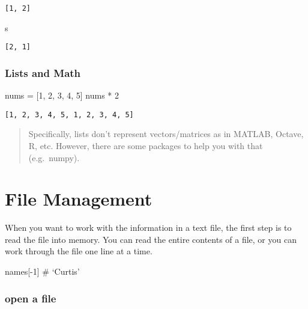 \documentclass[
  letterpaper,
  DIV=11,
  numbers=noendperiod]{scrreprt}
\newenvironment{Shaded}{\begin{snugshade}}{\end{snugshade}}
\newcommand{\DecValTok}[1]{\textcolor[rgb]{0.68,0.00,0.00}{#1}}
\newcommand{\NormalTok}[1]{\textcolor[rgb]{0.00,0.46,0.62}{#1}}
\newcommand{\OperatorTok}[1]{\textcolor[rgb]{0.37,0.37,0.37}{#1}}
\begin{document}
\begin{verbatim}
[1, 2]
\end{verbatim}

\begin{Shaded}
\begin{Highlighting}[]
\NormalTok{s}
\end{Highlighting}
\end{Shaded}

\begin{verbatim}
[2, 1]
\end{verbatim}

\hypertarget{lists-and-math}{%
\subsubsection{Lists and Math}\label{lists-and-math}}

\begin{Shaded}
\begin{Highlighting}[]
\NormalTok{nums }\OperatorTok{=}\NormalTok{ [}\DecValTok{1}\NormalTok{, }\DecValTok{2}\NormalTok{, }\DecValTok{3}\NormalTok{, }\DecValTok{4}\NormalTok{, }\DecValTok{5}\NormalTok{]}
\NormalTok{nums }\OperatorTok{*} \DecValTok{2}
\end{Highlighting}
\end{Shaded}

\begin{verbatim}
[1, 2, 3, 4, 5, 1, 2, 3, 4, 5]
\end{verbatim}

\begin{quote}
Specifically, lists don't represent vectors/matrices as in MATLAB,
Octave, R, etc. However, there are some packages to help you with that
(e.g.~numpy).
\end{quote}

\hypertarget{file-management}{%
\section{File Management}\label{file-management}}

When you want to work with the information in a text file, the first
step is to read the file into memory. You can read the entire contents
of a file, or you can work through the file one line at a time.

names{[}-1{]} \# `Curtis'

\hypertarget{open-a-file}{%
\subsubsection{open a file}\label{open-a-file}}
\end{document}
